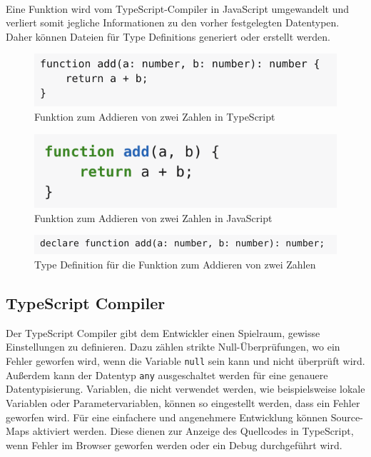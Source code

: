 \mbox{}\\
Eine Funktion wird vom TypeScript-Compiler in JavaScript umgewandelt und verliert somit jegliche Informationen zu den vorher festgelegten Datentypen. Daher können Dateien für Type Definitions generiert oder erstellt werden.

\begin{figure}[H]
	\begin{center}
		\includegraphics[scale=.7]{images/typescript-type-definition-1.png}
	\end{center}
		\caption{Funktion zum Addieren von zwei Zahlen in TypeScript}
\end{figure}

\begin{figure}[H]
	\begin{center}
		\includegraphics[scale=.7]{images/typescript-type-definition-2.png}
	\end{center}
		\caption{Funktion zum Addieren von zwei Zahlen in JavaScript}
\end{figure}

\begin{figure}[H]
	\begin{center}
		\includegraphics[scale=.7]{images/typescript-type-definition-3.png}
	\end{center}
		\caption{Type Definition für die Funktion zum Addieren von zwei Zahlen}
\end{figure}

\subsection{TypeScript Compiler}
Der TypeScript Compiler gibt dem Entwickler einen Spielraum, gewisse Einstellungen zu definieren. Dazu zählen strikte Null-Überprüfungen, wo ein Fehler geworfen wird, wenn die Variable \texttt{null} sein kann und nicht überprüft wird. Außerdem kann der Datentyp \texttt{any} ausgeschaltet werden für eine genauere Datentypisierung. Variablen, die nicht verwendet werden, wie beispielsweise lokale Variablen oder Parametervariablen, können so eingestellt werden, dass ein Fehler geworfen wird. Für eine einfachere und angenehmere Entwicklung können Source-Maps aktiviert werden. Diese dienen zur Anzeige des Quellcodes in TypeScript, wenn Fehler im Browser geworfen werden oder ein Debug durchgeführt wird.

